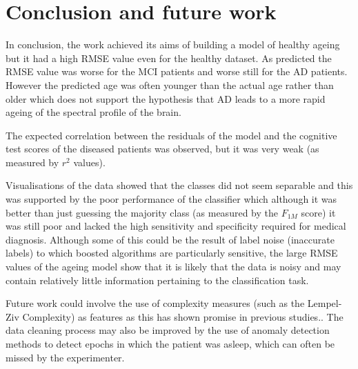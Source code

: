 \chapter{Conclusion and future work}

In conclusion, the work achieved its aims of building a model of healthy ageing but it had a high RMSE value even for the healthy dataset. As predicted the RMSE value was worse for the MCI patients and worse still for the AD patients. However the predicted age was often younger than the actual age rather than older which does not support the hypothesis that AD leads to a more rapid ageing of the spectral profile of the brain. 

The expected correlation between the residuals of the model and the cognitive test scores of the diseased patients was observed, but it was very weak (as measured by $r^2$ values).

Visualisations of the data showed that the classes did not seem separable and this was supported by the poor performance of the classifier which although it was better than just guessing the majority class (as measured by the $F_{1M}$ score) it was still poor and lacked the high sensitivity and specificity required for medical diagnosis. Although some of this could be the result of label noise (inaccurate labels) to which boosted algorithms are particularly sensitive, the large RMSE values of the ageing model show that it is likely that the data is noisy and may contain relatively little information pertaining to the classification task.

Future work could involve the use of complexity measures (such as the Lempel-Ziv Complexity) as features as this has shown promise in previous studies.\cite{Hornero2008}\cite{Fernandez2012}. The data cleaning process may also be improved by the use of anomaly detection methods\cite{Chandola2009} to detect epochs in which the patient was asleep, which can often be missed by the experimenter.  